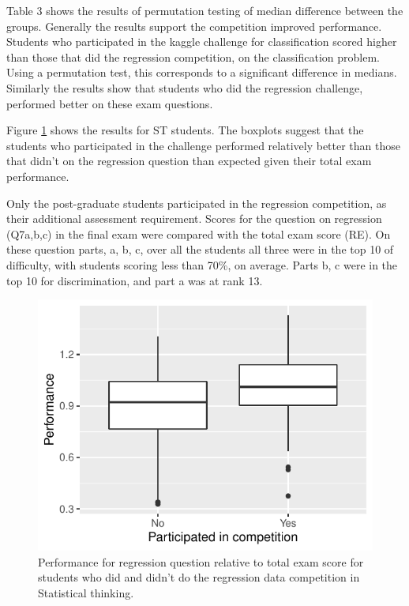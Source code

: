 \documentclass[12pt]{article}
\begin{document}
Table 3 shows the results of permutation testing of median difference
between the groups. Generally the results support the competition
improved performance. Students who participated in the kaggle challenge
for classification scored higher than those that did the regression
competition, on the classification problem. Using a permutation test,
this corresponds to a significant difference in medians. Similarly the
results show that students who did the regression challenge, performed
better on these exam questions.

Figure \ref{fig:ETC5242} shows the results for ST students. The boxplots
suggest that the students who participated in the challenge performed
relatively better than those that didn't on the regression question than
expected given their total exam performance.

Only the post-graduate students participated in the regression
competition, as their additional assessment requirement. Scores for the
question on regression (Q7a,b,c) in the final exam were compared with
the total exam score (RE). On these question parts, a, b, c, over all
the students all three were in the top 10 of difficulty, with students
scoring less than 70\%, on average. Parts b, c were in the top 10 for
discrimination, and part a was at rank 13.

\begin{figure}
\centering
\includegraphics{paper-kaggle_files/figure-latex/ETC5242-1.pdf}
\caption{\label{fig:ETC5242} Performance for regression question
relative to total exam score for students who did and didn't do the
regression data competition in Statistical thinking.}
\end{figure}
\end{document}
